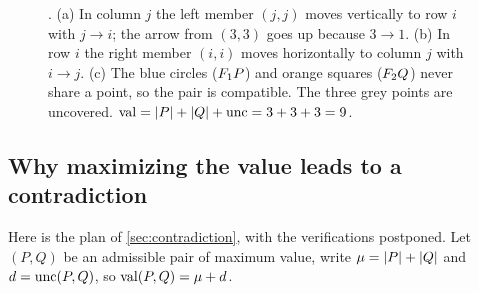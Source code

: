 \begin{figure}[ht]
\caption{. (a) In column $j$ the left member $(j,j)$
moves vertically to row $i$ with $j\to i$; the arrow from $(3,3)$ goes up
because $3\to1$. (b) In row $i$ the right member $(i,i)$ moves
horizontally to column $j$ with $i\to j$. (c) The blue circles ($F_1 P$)
and orange squares ($F_2 Q$) never share a point, so the pair is
compatible. The three grey points are uncovered.
$\operatorname{val}=\lvert P\rvert+\lvert Q\rvert+\operatorname{unc}=3+3+3=9$.}
\label{fig:triangle-grid}
\end{figure}

\subsection{Why maximizing the value leads to a contradiction}\label{sec:ledger}

Here is the plan of \cref{sec:contradiction}, with the verifications
postponed. Let $(P,Q)$ be an admissible pair of maximum value, write
$\mu=\lvert P\rvert+\lvert Q\rvert$ and $d=\operatorname{unc}(P,Q)$, so $\operatorname{val}(P,Q)=\mu+d$.

